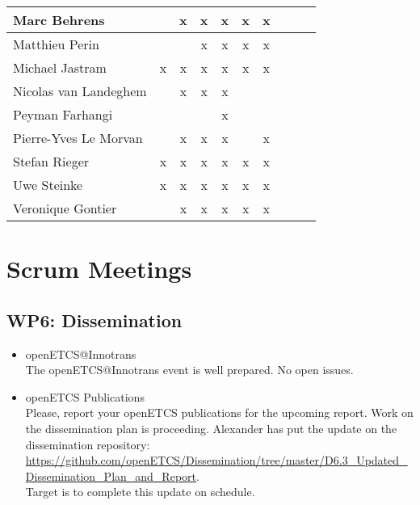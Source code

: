 \documentclass[a4paper, 11pt]{article}
\begin{document}
\begin{tabular}{|l|c|c|c||c|c|c||c|c|c|}
Marc Behrens         &   & x & x & x & x & x \\\hline
Matthieu Perin       &   &   & x & x & x & x \\\hline
Michael Jastram      & x & x & x & x & x & x \\\hline
Nicolas van Landeghem&   & x & x & x &   &   \\\hline
Peyman Farhangi      &   &   &   & x &   &   \\\hline
Pierre-Yves Le Morvan&   & x & x & x &   & x \\\hline
Stefan Rieger        & x & x & x & x & x & x \\\hline
Uwe Steinke          & x & x & x & x & x & x \\\hline
Veronique Gontier    &   & x & x & x & x & x \\\hline
\end{tabular}


\section{Scrum Meetings}

\subsection{WP6: Dissemination}
\begin{itemize}
\item openETCS@Innotrans\\
The openETCS@Innotrans event is well prepared. No open issues. 

\item openETCS Publications\\
Please, report your openETCS publications for the upcoming report.
Work on the dissemination plan is proceeding. Alexander has put the update on the dissemination repository:
\url{https://github.com/openETCS/Dissemination/tree/master/D6.3_Updated_Dissemination_Plan_and_Report}.\\
Target is to complete this update on schedule.

\end{itemize}
\end{document}
